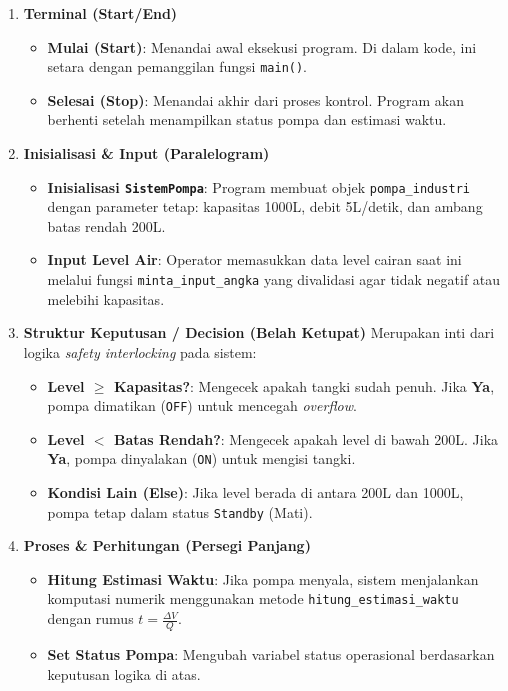 \documentclass[12pt,a4paper]{article}
\begin{document}
\begin{enumerate}
    \item \textbf{Terminal (Start/End)}
    \begin{itemize}
        \item \textbf{Mulai (Start)}: Menandai awal eksekusi program. Di dalam kode, ini setara dengan pemanggilan fungsi \texttt{main()}.
        \item \textbf{Selesai (Stop)}: Menandai akhir dari proses kontrol. Program akan berhenti setelah menampilkan status pompa dan estimasi waktu.
    \end{itemize}

    \item \textbf{Inisialisasi \& Input (Paralelogram)}
    \begin{itemize}
        \item \textbf{Inisialisasi \texttt{SistemPompa}}: Program membuat objek \texttt{pompa\_industri} dengan parameter tetap: kapasitas 1000L, debit 5L/detik, dan ambang batas rendah 200L.
        \item \textbf{Input Level Air}: Operator memasukkan data level cairan saat ini melalui fungsi \texttt{minta\_input\_angka} yang divalidasi agar tidak negatif atau melebihi kapasitas.
    \end{itemize}

    \item \textbf{Struktur Keputusan / Decision (Belah Ketupat)}
    Merupakan inti dari logika \textit{safety interlocking} pada sistem:
    \begin{itemize}
        \item \textbf{Level $\geq$ Kapasitas?}: Mengecek apakah tangki sudah penuh. Jika \textbf{Ya}, pompa dimatikan (\texttt{OFF}) untuk mencegah \textit{overflow}.
        \item \textbf{Level $<$ Batas Rendah?}: Mengecek apakah level di bawah 200L. Jika \textbf{Ya}, pompa dinyalakan (\texttt{ON}) untuk mengisi tangki.
        \item \textbf{Kondisi Lain (Else)}: Jika level berada di antara 200L dan 1000L, pompa tetap dalam status \texttt{Standby} (Mati).
    \end{itemize}

    \item \textbf{Proses \& Perhitungan (Persegi Panjang)}
    \begin{itemize}
        \item \textbf{Hitung Estimasi Waktu}: Jika pompa menyala, sistem menjalankan komputasi numerik menggunakan metode \texttt{hitung\_estimasi\_waktu} dengan rumus $t = \frac{\Delta V}{Q}$.
        \item \textbf{Set Status Pompa}: Mengubah variabel status operasional berdasarkan keputusan logika di atas.
    \end{itemize}


\end{enumerate}
\end{document}
